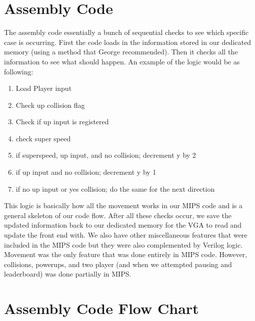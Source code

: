 \documentclass[letterpaper]{article} %
\begin{document}
\section{Assembly Code}

    The assembly code essentially a bunch of sequential checks to see which specific case is occurring. First the code loads in the information stored in our dedicated memory (using a method that George recommended). Then it checks all the information to see what should happen. An example of the logic would be as following: \par
    
    \begin{enumerate}
        \item Load Player input
        \item Check up collision flag
        \item Check if up input is registered
        \item check super speed
        \item if superspeed, up input, and no collision; decrement y by 2
        \item if up input and no collision; decrement y by 1
        \item if no up input or yes collision; do the same for the next direction
    \end{enumerate}
    
    This logic is basically how all the movement works in our MIPS code and is a general skeleton of our code flow. After all these checks occur, we save the updated information back to our dedicated memory for the VGA to read and update the front end with. We also have other miscellaneous features that were included in the MIPS code but they were also complemented by Verilog logic. Movement was the only feature that was done entirely in MIPS code. However, collisions, powerups, and two player (and when we attempted pausing and leaderboard) was done partially in MIPS.
    
 

\section{Assembly Code Flow Chart}
\end{document}

